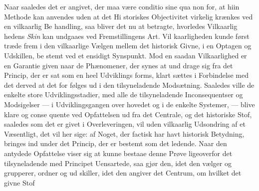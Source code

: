 Naar saaledes det er angivet, der maa være conditio sine
qua non for, at hiin Methode kan anvendes uden at det Hi\-%
storiskes Objectivitet virkelig krænkes ved en vilkaarlig Be\-%
handling, saa bliver det nu at betragte, hvorledes Vilkaarlig\-%
hedens \emph{Skin} kan undgaaes ved Fremstillingens Art. Vil\-%
kaarligheden kunde først træde frem i den vilkaarlige Vælgen
mellem det historisk Givne, i en Optagen og Udskillen, be\-%
stemt ved et ensidigt Synspunkt. Mod en saadan Vilkaarlighed
er en Garantie given naar de Phænomener, der synes at und\-%
drage sig fra det Princip, der er sat som en heel Udviklings\-%
forms, klart sættes i Forbindelse med det derved at det for\-%
følges ud i den tilsyneladende Modsætning. Saaledes ville de
enkelte store Udviklingsstadier, med alle de tilsyneladende
Inconsequentser og Modsigelser --- i Udviklingsgangen over\-%
hovedet og i de enkelte Systemer, --- blive klare og conse\-%
quente ved Opfattelsen ud fra det Centrale, og det historiske
Stof, saaledes som det er givet i Overleveringen, vil uden
vilkaarlig Udsondring af et Væsentligt, det vil her sige: af
Noget, der factisk har havt historisk Betydning, bringes ind
under det Princip, der er bestemt som det ledende. Naar
den antydede Opfattelse viser sig at kunne bestaae denne
Prøve ligeoverfor det tilsyneladende med Principet Uensartede,
saa gjør den, idet den vælger og grupperer, ordner og ud\-%
skiller, idet den angiver det Centrum, om hvilket det givne Stof
